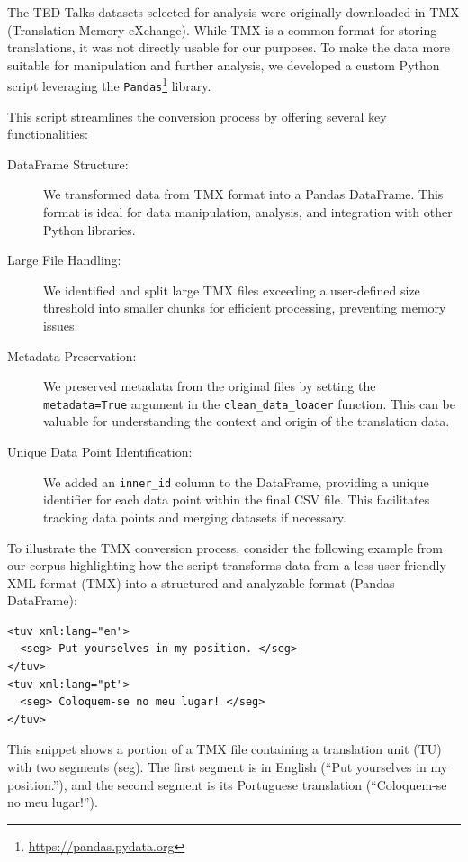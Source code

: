The TED Talks datasets selected for analysis were originally downloaded in TMX (Translation Memory eXchange). While TMX is a common format for storing translations, it was not directly usable for our purposes. To make the data more suitable for manipulation and further analysis, we developed a custom Python script leveraging the \texttt{Pandas}\footnote{\href{https://pandas.pydata.org}{https://pandas.pydata.org}} library. 

This script streamlines the conversion process by offering several key functionalities:

\begin{description}
    \item[DataFrame Structure:] We transformed data from TMX format into a Pandas DataFrame. This format is ideal for data manipulation, analysis, and integration with other Python libraries.
    \item[Large File Handling:] We identified and split large TMX files exceeding a user-defined size threshold into smaller chunks for efficient processing, preventing memory issues.
    \item[Metadata Preservation:] We preserved metadata from the original files by setting the \texttt{metadata=True} argument in the \texttt{clean\_data\_loader} function. This can be valuable for understanding the context and origin of the translation data.
    \item[Unique Data Point Identification:] We added an \texttt{inner\_id} column to the DataFrame, providing a unique identifier for each data point within the final CSV file. This facilitates tracking data points and merging datasets if necessary.
\end{description}

To illustrate the TMX conversion process, consider the following example from our corpus highlighting how the script transforms data from a less user-friendly XML format (TMX) into a structured and analyzable format (Pandas DataFrame):

\begin{verbatim} 
<tuv xml:lang="en">
  <seg> Put yourselves in my position. </seg>
</tuv>
<tuv xml:lang="pt">
  <seg> Coloquem-se no meu lugar! </seg>
</tuv>
\end{verbatim}


This snippet shows a portion of a TMX file containing a translation unit (TU) with two segments (seg). The first segment is in English (``Put yourselves in my position.''), and the second segment is its Portuguese translation (``Coloquem-se no meu lugar!'').

